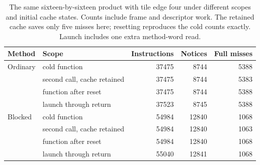\begin{table}[htbp]
  \centering
  \small
  \begin{tabular}{llrrr}
    \toprule
    Method   & Scope                       & Instructions & Notices & Full misses \\
    \midrule
    Ordinary & cold function               & 37475        & 8744    & 5388        \\
             & second call, cache retained & 37475        & 8744    & 5383        \\
             & function after reset        & 37475        & 8744    & 5388        \\
             & launch through return       & 37523        & 8745    & 5388        \\
    Blocked  & cold function               & 54984        & 12840   & 1068        \\
             & second call, cache retained & 54984        & 12840   & 1063        \\
             & function after reset        & 54984        & 12840   & 1068        \\
             & launch through return       & 55040        & 12841   & 1068        \\
    \bottomrule
  \end{tabular}
  \caption{The same sixteen-by-sixteen product with tile edge four under different scopes and initial cache states. Counts include frame and descriptor work. The retained cache saves only five misses here; resetting reproduces the cold counts exactly. Launch includes one extra method-word read.}
  \label{tab:revision-measurement-scopes}
\end{table}
